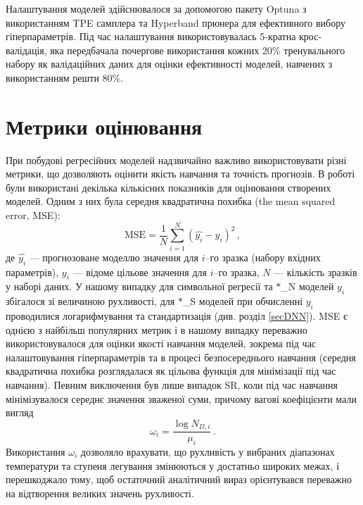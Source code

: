 \documentclass[12pt,a4paper,titlepage,oneside]{book}
\numberwithin{equation}{part}
\begin{document}
Налаштування моделей здійснювалося за допомогою пакету Optuna \cite{Akiba2019} з використанням TPE самплера та Hyperband прюнера
для ефективного вибору гіперпараметрів.
Під час налаштування використовувалась 5-кратна крос-валідація, яка передбачала почергове використання кожних 20\% тренувального набору
як валідаційних даних для оцінки ефективності моделей, навчених з використанням решти 80\%.




\section{Метрики оцінювання}

При побудові регресійних моделей надзвичайно важливо використовувати різні метрики,
що дозволяють оцінити якість навчання та точність прогнозів.
В роботі були використані декілька кількісних показників для оцінювання створених моделей.
Одним з них була середня квадратична похибка (the mean squared error, MSE):
\begin{equation}
\label{eqMSE}
    \mathrm{MSE} = \frac{1}{N}\displaystyle\sum_{i=1}^{N} (\hat{y_i}-y_i)^2\,,
\end{equation}
де
$\hat{y_i}$ --- прогнозоване моделлю значення для $i$--го зразка (набору вхідних параметрів),
$y_i$ --- відоме цільове значення для $i$--го зразка,
$N$ --- кількість зразків у наборі даних.
У нашому випадку для символьної регресії та $*$\_N моделей $y_i$ збігалося зі величиною рухливості,
для $*$\_S моделей при обчисленні $y_i$ проводилися логарифмування та стандартизація (див. розділ \ref{secDNN}).
MSE є однією з найбільш популярних метрик і в нашому випадку переважно використовувалося для оцінки якості
навчання моделей, зокрема під час налаштовування гіперпараметрів та в процесі безпосереднього навчання (середня квадратична похибка розглядалася як
цільова функція для мінімізації під час навчання).
Певним виключення був лише випадок SR, коли під час навчання мінімізувалося середнє значення зваженої суми, причому вагові коефіцієнти мали вигляд
\begin{equation}
\label{eqWi}
    \omega_i = \frac{\log N_{D,i}}{\mu_i}\,.
\end{equation}
Використання $\omega_i$ дозволяло врахувати, що рухливість у вибраних діапазонах температури та ступеня легування
змінюються у достатньо широких межах, і перешкоджало тому, щоб остаточний аналітичний вираз орієнтувався переважно
на відтворення великих значень рухливості.
\end{document}
